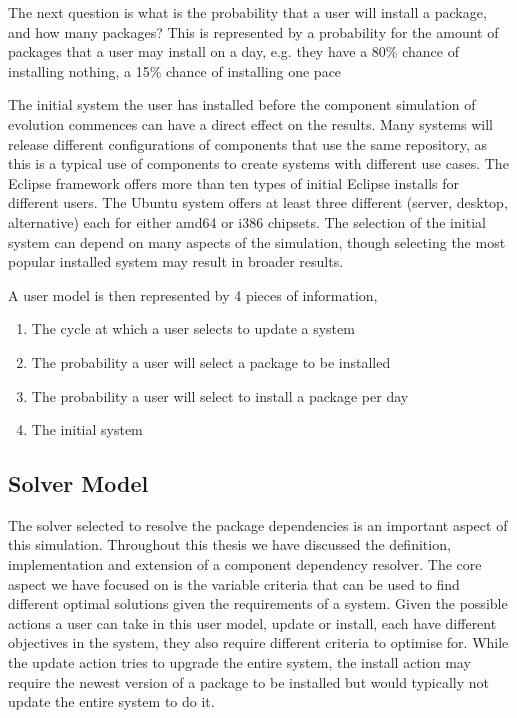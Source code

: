 The next question is what is the probability that a user will install a package, and how many packages?
This is represented by a probability for the amount of packages that a user may install on a day,
e.g. they have a 80\% chance of installing nothing, a 15\% chance of installing one pace

The initial system the user has installed before the component simulation of evolution commences can have a direct effect on the results.
Many systems will release different configurations of components that use the same repository, as this is a typical use of components to create systems with different use cases.
The Eclipse framework offers more than ten types of initial Eclipse installs for different users.
The Ubuntu system offers at least three different (server, desktop, alternative) each for either amd64 or i386 chipsets.
The selection of the initial system can depend on many aspects of the simulation, 
though selecting the most popular installed system may result in broader results. 

A user model is then represented by 4 pieces of information,
\begin{enumerate}
  \item  The cycle at which a user selects to update a system
  \item The probability a user will select a package to be installed
  \item The probability a user will select to install a package per day
  \item The initial system
\end{enumerate}


\subsection{Solver Model}
The solver selected to resolve the package dependencies is an important aspect of this simulation.
Throughout this thesis we have discussed the definition, implementation and extension of a component dependency resolver.
The core aspect we have focused on is the variable criteria that can be used to find different optimal solutions given the requirements of a system.
Given the possible actions a user can take in this user model, update or install, each have different objectives in the system,
they also require different criteria to optimise for.
While the update action tries to upgrade the entire system, 
the install action may require the newest version of a package to be installed but would typically not update the entire system to do it. 

